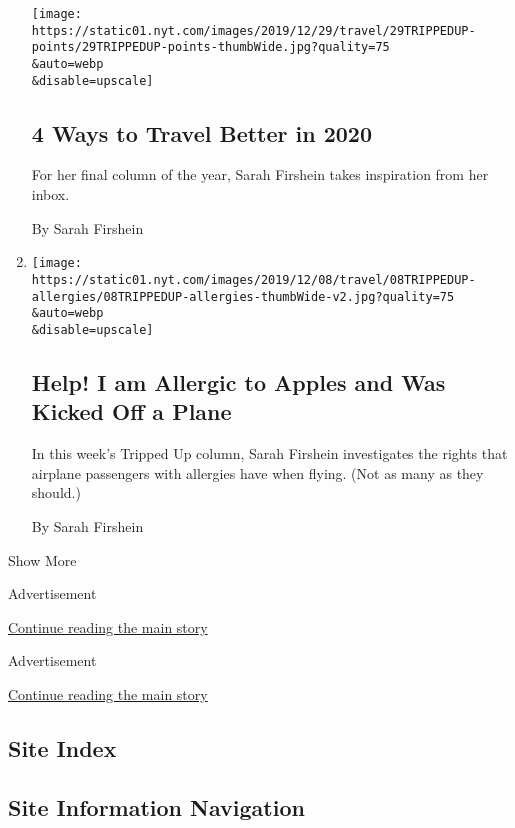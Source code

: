 \begin{enumerate}
  \texttt{[image: https://static01.nyt.com/images/2019/12/29/travel/29TRIPPEDUP-points/29TRIPPEDUP-points-thumbWide.jpg?quality=75\\\&auto=webp\\\&disable=upscale]}

  \hypertarget{4-ways-to-travel-better-in-2020}{%
  \subsection{4 Ways to Travel Better in
  2020}\label{4-ways-to-travel-better-in-2020}}

  For her final column of the year, Sarah Firshein takes inspiration
  from her inbox.

  By Sarah Firshein
\item
  \href{/2019/12/07/travel/allergies-airplane.html}{}

  \texttt{[image: https://static01.nyt.com/images/2019/12/08/travel/08TRIPPEDUP-allergies/08TRIPPEDUP-allergies-thumbWide-v2.jpg?quality=75\\\&auto=webp\\\&disable=upscale]}

  \hypertarget{help-i-am-allergic-to-apples-and-was-kicked-off-a-plane}{%
  \subsection{Help! I am Allergic to Apples and Was Kicked Off a
  Plane}\label{help-i-am-allergic-to-apples-and-was-kicked-off-a-plane}}

  In this week's Tripped Up column, Sarah Firshein investigates the
  rights that airplane passengers with allergies have when flying. (Not
  as many as they should.)

  By Sarah Firshein
\end{enumerate}

Show More

Advertisement

\protect\hyperlink{after-mid1}{Continue reading the main story}

Advertisement

\protect\hyperlink{after-mktg}{Continue reading the main story}

\hypertarget{site-index}{%
\subsection{Site Index}\label{site-index}}

\hypertarget{site-information-navigation}{%
\subsection{Site Information
Navigation}\label{site-information-navigation}}


